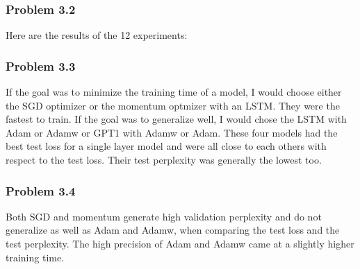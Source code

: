 \documentclass[12pt]{article}
\theoremstyle{definition}
\begin{document}
\subsubsection*{Problem 3.2}
Here are the results of the 12 experiments:
\begin{table}[H]
\caption{Results for the 12 experiments. Each models were trained on 10 epochs}
\end{table}

\subsubsection*{Problem 3.3}
If the goal was to minimize the training time of a model, I would choose either
the SGD optimizer or the momentum optmizer with an LSTM. They were the fastest
to train. If the goal was to generalize well, I would chose the LSTM with Adam
or Adamw or GPT1 with Adamw or Adam. These four models had the best test loss for a
single layer model and were all close to each others with respect to the
test loss. Their test perplexity was generally the lowest too.
\subsubsection*{Problem 3.4}
Both SGD and momentum generate high validation perplexity and do not generalize
as well as Adam and Adamw, when comparing the test loss and the test perplexity.
The high precision of Adam and Adamw came at a slightly higher training time.
\end{document}
